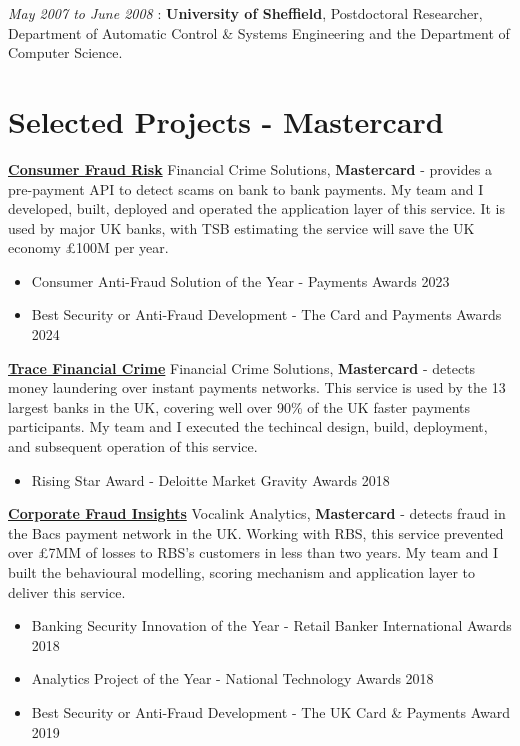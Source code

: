 \documentclass[line, overlapped]{res}
\begin{document}
\begin{resume}
  \emph{May 2007 to June 2008} : \textbf{University of Sheffield},
  Postdoctoral Researcher, Department of Automatic Control \& Systems
  Engineering and the Department of Computer Science.

\section{Selected Projects - Mastercard}

	\href{https://www.bloomberg.com/news/articles/2023-07-05/mastercard-s-ai-tool-helps-nine-british-banks-tackle-scams}{\textbf{Consumer Fraud Risk}} Financial Crime Solutions, \textbf{Mastercard} - provides a pre-payment API to detect scams on bank to bank payments. My team and I developed, built, deployed and operated the application layer of this service. It is used by major UK banks, with TSB estimating the service will save the UK economy £100M per year.
  \begin{itemize}
  \item
    Consumer Anti-Fraud Solution of the Year - Payments Awards 2023
  \item
    Best Security or Anti-Fraud Development - The Card and Payments
    Awards 2024
  \end{itemize}
	\href{https://www.vocalink.com/news-insights/case-studies/case-study-mits/}{\textbf{Trace Financial Crime}} Financial Crime Solutions, \textbf{Mastercard} - detects money laundering over instant payments networks. This service is used by the 13 largest banks in the UK, covering well over 90\% of the UK faster payments participants. My team and I executed the techincal design, build, deployment, and subsequent operation of this service.

  \begin{itemize}
  \item
    Rising Star Award - Deloitte Market Gravity Awards 2018
  \end{itemize}
	\href{https://www.thetimes.co.uk/article/rbs-system-pushes-back-against-invoice-fraudsters-88h92l5ml}{\textbf{Corporate Fraud Insights}} Vocalink Analytics, \textbf{Mastercard} - detects fraud in the Bacs payment network in the UK. Working with RBS, this service prevented over £7MM of losses to RBS’s customers in less than two years. My team and I built the behavioural modelling, scoring mechanism and application layer to deliver this service. 

  \begin{itemize}
  \item
    Banking Security Innovation of the Year - Retail Banker
    International Awards 2018
  \item
    Analytics Project of the Year - National Technology Awards 2018
  \item
    Best Security or Anti-Fraud Development - The UK Card \& Payments
    Award 2019
  \end{itemize}

\end{resume}
\end{document}
